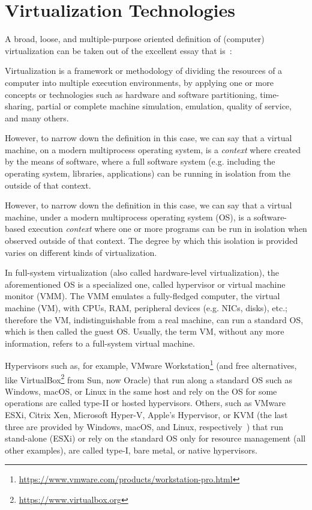 \section{Virtualization Technologies}
\label{sec:leavingvirtualization}

A broad, loose, and multiple-purpose oriented definition of (computer) virtualization can be taken out of the excellent essay that is~\cite{introvirtualization}:
\begin{displayquote}
Virtualization is a framework or methodology of dividing the resources of a computer into multiple execution environments, by applying one or more concepts or technologies such as hardware and software partitioning, time-sharing, partial or complete machine simulation, emulation, quality of service, and many others.
\end{displayquote}

However, to narrow down the definition in this case, we can say that a virtual machine, on a modern multiprocess operating system, is a \emph{context} where created by the means of software, where a full software system (e.g. including the operating system, libraries, applications\textellipsis) can be running in isolation from the outside of that context.

However, to narrow down the definition in this case, we can say that a virtual machine, under  a modern multiprocess operating system (OS), is a software-based execution \emph{context} where one or more programs can be run in isolation when observed outside of that context.
The degree by which this isolation is provided varies on different kinds of virtualization.

In full-system virtualization (also called hardware-level virtualization), the aforementioned OS is a specialized one, called hypervisor or virtual machine monitor (VMM).
The VMM emulates a fully-fledged computer, the virtual machine (VM), with CPUs, RAM, peripheral devices (e.g. NICs, disks), etc.; therefore the VM, indistinguishable from a real machine, can run a standard OS, which is then called the guest OS.
Usually, the term VM, without any more information, refers to a full-system virtual machine.

Hypervisors such as, for example, VMware Workstation\footnote{\url{https://www.vmware.com/products/workstation-pro.html}} (and free alternatives, like VirtualBox\footnote{\url{https://www.virtualbox.org}} from Sun, now Oracle) that run along a standard OS such as Windows, macOS, or Linux in the same host and rely on the OS for some operations are called type-II or hosted hypervisors.
Others, such as VMware ESXi, Citrix Xen, Microsoft Hyper-V, Apple's Hypervisor, or KVM (the last three are provided by Windows, macOS, and Linux, respectively~\cite{whatiskvm,applehypervisor,hyperv}) that run stand-alone (ESXi) or rely on the standard OS only for resource management (all other examples), are called type-I, bare metal, or native hypervisors.

